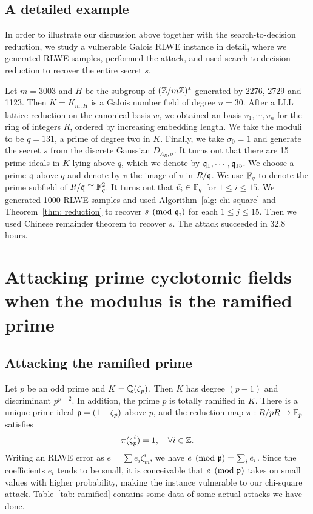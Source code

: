 \documentclass{amsart}
\begin{document}
\subsection{A detailed example}
In order to illustrate our discussion above together with the search-to-decision reduction, we study a vulnerable Galois RLWE instance in detail, where we generated RLWE samples, performed the attack, and used search-to-decision reduction to recover the entire secret $s$.


Let $m = 3003$ and $H$ be the subgroup of $(\mathbb{Z}/m\mathbb{Z})^*$ generated by 2276, 2729 and 1123. Then $K = K_{m,H}$ is a Galois number field of degree $n = 30$. After a LLL lattice reduction on the canonical basis $w$, we obtained an basis $v_1, \cdots, v_n$ for the ring of integers $R$, ordered by increasing embedding length. We take the moduli to be $q = 131$, a prime of degree two in $K$. Finally, we take $\sigma_0 = 1$ and generate the secret $s$ from the discrete Gaussian $D_{\Lambda_R, \sigma}$. It turns out that there are 15 prime ideals in $K$ lying above $q$, which we denote by $\mathfrak{q}_1, \cdots, \mathfrak{q}_{15}$. We choose a prime $\mathfrak{q}$ above $q$ and denote by $\bar{v}$ the image of $v$ in $R/\mathfrak{q}$. We use $\mathbb{F}_q$ to denote the prime subfield of $R/\mathfrak{q} \cong \mathbb{F}_q^2$. It turns out that $\bar{v_i} \in \mathbb{F}_q$ for $1 \leq i \leq 15$. We generated 1000 RLWE samples and used Algorithm~\ref{alg: chi-square} and Theorem~\ref{thm: reduction} to recover $s \pmod {\mathfrak{q}_i}$ for each $1 \leq j \leq 15$. Then we used Chinese remainder theorem to recover $s$. The attack succeeded in 32.8 hours.





\section{Attacking prime cyclotomic fields when the modulus is the ramified prime}
\label{sec: ramified-prime}

\subsection{Attacking the ramified prime} Let $p$ be an odd prime and $K = \mathbb{Q}(\zeta_p)$. Then $K$ has degree $(p-1)$ and discriminant $p^{p-2}$.
In addition, the prime $p$ is totally ramified in $K$. There is a unique prime ideal $\mathfrak{p} = (1 - \zeta_p)$ above $p$, and the reduction map  $\pi: R/pR \to \mathbb{F}_p$ satisfies
\[
        \pi(\zeta_p^i) = 1, \quad \forall i \in \mathbb{Z}.
\]
Writing an RLWE error as  $e = \sum e_i \zeta_m^i$, we have $e \pmod{\mathfrak{p}} = \sum_i e_i$. Since the coefficients $e_i$ tends to be small, it is conceivable that  $e \pmod{\mathfrak{p}}$ takes on small values with higher probability, making the instance vulnerable to our chi-square attack. Table~\ref{tab: ramified} contains some data of some actual attacks we have done.
\end{document}
